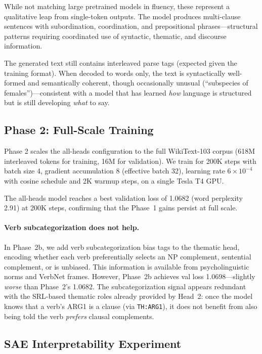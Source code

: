 \documentclass[11pt]{article}
\begin{document}
While not matching large pretrained models in fluency, these represent 
a qualitative leap from single-token outputs. The model produces 
multi-clause sentences with subordination, coordination, and prepositional 
phrases---structural patterns requiring coordinated use of syntactic, 
thematic, and discourse information.

The generated text still contains interleaved parse tags (expected given 
the training format). When decoded to words only, the text is syntactically 
well-formed and semantically coherent, though occasionally unusual 
(``subspecies of females'')---consistent with a model that has learned 
\emph{how} language is structured but is still developing \emph{what} 
to say.

\subsection{Phase 2: Full-Scale Training}

Phase 2 scales the all-heads configuration to the full WikiText-103 corpus 
(618M interleaved tokens for training, 16M for validation). We train for 
200K steps with batch size 4, gradient accumulation 8 (effective batch 32), 
learning rate $6 \times 10^{-4}$ with cosine schedule and 2K warmup steps, 
on a single Tesla T4 GPU.

The all-heads model reaches a best validation loss of 1.0682 (word perplexity 
2.91) at 200K steps, confirming that the Phase~1 gains persist at full scale.

\paragraph{Verb subcategorization does not help.}
In Phase~2b, we add verb subcategorization bias tags \cite{trueswell1993verb} 
to the thematic head, encoding whether each verb preferentially selects an NP 
complement, sentential complement, or is unbiased. This information is 
available from psycholinguistic norms and VerbNet frames. However, Phase~2b 
achieves val loss 1.0698---slightly \emph{worse} than Phase~2's 1.0682. The 
subcategorization signal appears redundant with the SRL-based thematic roles 
already provided by Head~2: once the model knows that a verb's ARG1 is a 
clause (via \texttt{TH:ARG1}), it does not benefit from also being told the 
verb \emph{prefers} clausal complements.

\subsection{SAE Interpretability Experiment}
\label{sec:sae}
\end{document}
